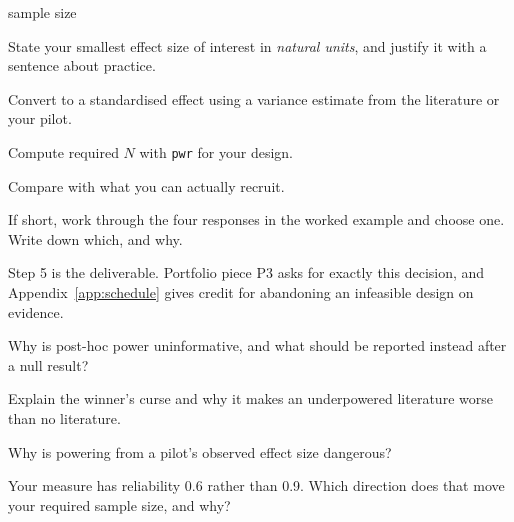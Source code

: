 \begin{traditions}{sample size}
\end{traditions}

\begin{lab}
\begin{tightnum}
  \item State your smallest effect size of interest in \emph{natural units},
    and justify it with a sentence about practice.
  \item Convert to a standardised effect using a variance estimate from the
    literature or your pilot.
  \item Compute required $N$ with \texttt{pwr} for your design.
  \item Compare with what you can actually recruit.
  \item If short, work through the four responses in the worked example and
    choose one. Write down which, and why.
\end{tightnum}

\medskip
Step 5 is the deliverable. Portfolio piece P3 asks for exactly this decision,
and Appendix~\ref{app:schedule} gives credit for abandoning an infeasible
design on evidence.
\end{lab}

\begin{checkpoint}
\begin{tightnum}
  \item Why is post-hoc power uninformative, and what should be reported
    instead after a null result?
  \item Explain the winner's curse and why it makes an underpowered literature
    worse than no literature.
  \item Why is powering from a pilot's observed effect size dangerous?
  \item Your measure has reliability 0.6 rather than 0.9. Which direction does
    that move your required sample size, and why?
\end{tightnum}
\end{checkpoint}

